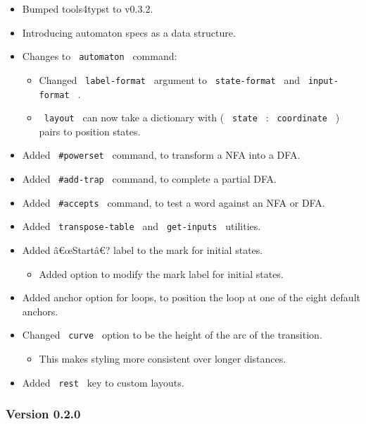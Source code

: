 \begin{itemize}
\tightlist
\item
  Bumped tools4typst to v0.3.2.
\item
  Introducing automaton specs as a data structure.
\item
  Changes to \texttt{\ automaton\ } command:

  \begin{itemize}
  \tightlist
  \item
    Changed \texttt{\ label-format\ } argument to
    \texttt{\ state-format\ } and \texttt{\ input-format\ } .
  \item
    \texttt{\ layout\ } can now take a dictionary with (
    \texttt{\ state\ } : \texttt{\ coordinate\ } ) pairs to position
    states.
  \end{itemize}
\item
  Added \texttt{\ \#powerset\ } command, to transform a NFA into a DFA.
\item
  Added \texttt{\ \#add-trap\ } command, to complete a partial DFA.
\item
  Added \texttt{\ \#accepts\ } command, to test a word against an NFA or
  DFA.
\item
  Added \texttt{\ transpose-table\ } and \texttt{\ get-inputs\ }
  utilities.
\item
  Added â€œStartâ€? label to the mark for initial states.

  \begin{itemize}
  \tightlist
  \item
    Added option to modify the mark label for initial states.
  \end{itemize}
\item
  Added anchor option for loops, to position the loop at one of the
  eight default anchors.
\item
  Changed \texttt{\ curve\ } option to be the height of the arc of the
  transition.

  \begin{itemize}
  \tightlist
  \item
    This makes styling more consistent over longer distances.
  \end{itemize}
\item
  Added \texttt{\ rest\ } key to custom layouts.
\end{itemize}

\subsubsection{Version 0.2.0}\label{version-0.2.0}

